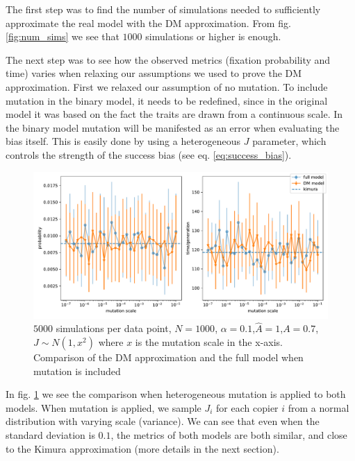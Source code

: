 \documentclass[11pt]{article}
\begin{document}
The first step was to find the number of simulations needed to sufficiently approximate the real model with the DM approximation. From fig. \ref{fig:num_sims} we see that $1000$ simulations or higher is enough.

The next step was to see how the observed metrics (fixation probability and time) varies when relaxing our assumptions we used to prove the DM approximation.
First we relaxed our assumption of no mutation. To include mutation in the binary model, it needs to be redefined, since in the original model it was based on the fact the traits are drawn from a continuous scale. In the binary model mutation will be manifested as an error when evaluating the bias itself. This is easily done by using a heterogeneous $J$ parameter, which controls the strength of the success bias (see eq. \ref{eq:success_bias}).


\begin{figure}
    \includegraphics[width=\linewidth]{../figures/binary/full_vs_dm_mutation.pdf}
  \caption{$5000$ simulations per data point, $N=1000$, $\alpha=0.1$,$\hat{A}=1$,$A=0.7$, $J\sim N(1,x^2)$ where $x$ is the mutation scale in the x-axis.
  Comparison of the DM approximation and the full model when mutation is included}	
  \label{fig:hetro_mutation}
\end{figure}


In fig. \ref{fig:hetro_mutation} we see the comparison when heterogeneous mutation is applied to both models. When mutation is applied, we sample $J_i$ for each copier $i$ from a normal distribution with varying scale (variance).
We can see that even when the standard deviation is $0.1$, the metrics of both models are both similar, and close to the Kimura approximation (more details in the next section). 
\end{document}
